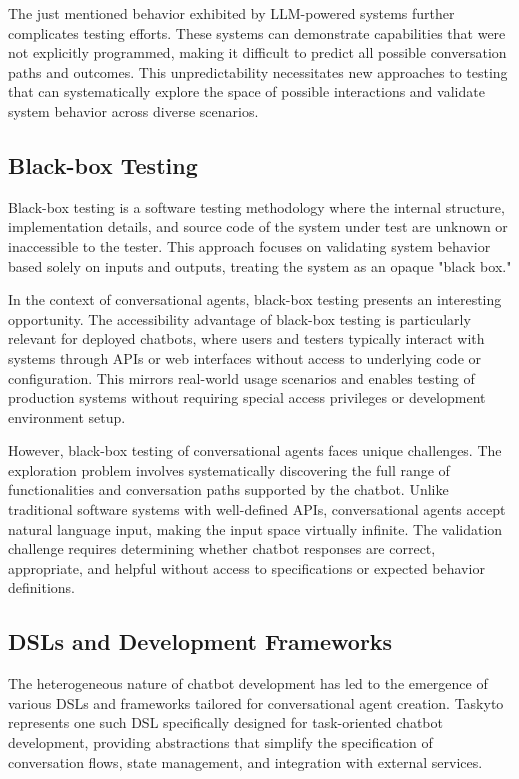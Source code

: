 The just mentioned behavior exhibited by \ac{LLM}-powered systems
further complicates testing efforts.
These systems can demonstrate capabilities that were not explicitly programmed,
making it difficult to predict all possible conversation paths and outcomes.
This unpredictability necessitates new approaches to testing
that can systematically explore the space of possible interactions
and validate system behavior across diverse scenarios.

\subsection{Black-box Testing}

Black-box testing is a software testing methodology
where the internal structure, implementation details, and source code of the system under test
are unknown or inaccessible to the tester.
This approach focuses on validating system behavior based solely on inputs and outputs,
treating the system as an opaque "black box."

In the context of conversational agents,
black-box testing presents an interesting opportunity.
The accessibility advantage of black-box testing
is particularly relevant for deployed chatbots,
where users and testers typically interact with systems
through APIs or web interfaces without access to underlying code or configuration.
This mirrors real-world usage scenarios
and enables testing of production systems
without requiring special access privileges or development environment setup.


However, black-box testing of conversational agents faces unique challenges.
The exploration problem involves
systematically discovering the full range of functionalities
and conversation paths supported by the chatbot.
Unlike traditional software systems with well-defined APIs,
conversational agents accept natural language input,
making the input space virtually infinite.
The validation challenge requires determining
whether chatbot responses are correct, appropriate, and helpful
without access to specifications or expected behavior definitions.

\subsection{\aclp{DSL} and Development Frameworks}

The heterogeneous nature of chatbot development
has led to the emergence of various \aclp{DSL} and frameworks
tailored for conversational agent creation.
Taskyto \autocite{sanchezcuadradoAutomatingDevelopmentTaskoriented2024} represents one such DSL specifically designed for task-oriented chatbot development,
providing abstractions that simplify the specification of
conversation flows, state management, and integration with external services.


